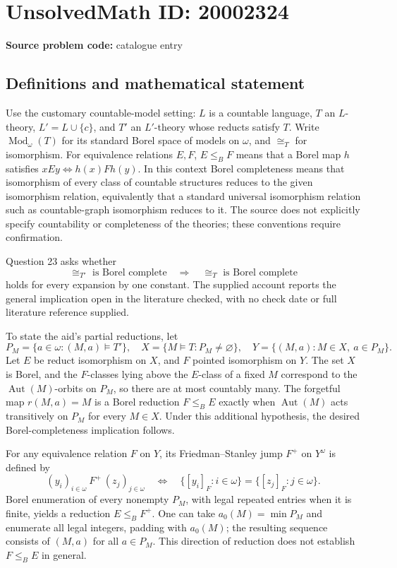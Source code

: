 \documentclass[11pt]{article}
\begin{document}
\section*{UnsolvedMath ID: 20002324}
\textbf{Source problem code:} catalogue entry
\subsection{Definitions and mathematical statement}
Use the customary countable-model setting: $L$ is a countable language, $T$ an $L$-theory, $L'=L\cup\{c\}$, and $T'$ an $L'$-theory whose reducts satisfy $T$. Write $\operatorname{Mod}_\omega(T)$ for its standard Borel space of models on $\omega$, and $\cong_T$ for isomorphism. For equivalence relations $E,F$, $E\leq_B F$ means that a Borel map $h$ satisfies $xEy\Longleftrightarrow h(x)Fh(y)$. In this context Borel completeness means that isomorphism of every class of countable structures reduces to the given isomorphism relation, equivalently that a standard universal isomorphism relation such as countable-graph isomorphism reduces to it. The source does not explicitly specify countability or completeness of the theories; these conventions require confirmation.

Question 23 asks whether
\[
\cong_{T'}\text{ is Borel complete}\quad\Longrightarrow\quad
\cong_T\text{ is Borel complete}
\]
holds for every expansion by one constant. The supplied account reports the general implication open in the literature checked, with no check date or full literature reference supplied.

To state the aid's partial reductions, let
\[
P_M=\{a\in\omega:(M,a)\models T'\},\quad
X=\{M\models T:P_M\ne\varnothing\},\quad
Y=\{(M,a):M\in X,\ a\in P_M\}.
\]
Let $E$ be reduct isomorphism on $X$, and $F$ pointed isomorphism on $Y$. The set $X$ is Borel, and the $F$-classes lying above the $E$-class of a fixed $M$ correspond to the $\operatorname{Aut}(M)$-orbits on $P_M$, so there are at most countably many. The forgetful map $r(M,a)=M$ is a Borel reduction $F\leq_B E$ exactly when $\operatorname{Aut}(M)$ acts transitively on $P_M$ for every $M\in X$. Under this additional hypothesis, the desired Borel-completeness implication follows.

For any equivalence relation $F$ on $Y$, its Friedman--Stanley jump $F^+$ on $Y^\omega$ is defined by
\[
(y_i)_{i\in\omega}\ F^+\ (z_j)_{j\in\omega}
\quad\Longleftrightarrow\quad
\{[y_i]_F:i\in\omega\}=\{[z_j]_F:j\in\omega\}.
\]
Borel enumeration of every nonempty $P_M$, with legal repeated entries when it is finite, yields a reduction $E\leq_B F^+$. One can take $a_0(M)=\min P_M$ and enumerate all legal integers, padding with $a_0(M)$; the resulting sequence consists of $(M,a)$ for all $a\in P_M$. This direction of reduction does not establish $F\leq_B E$ in general.
\end{document}
